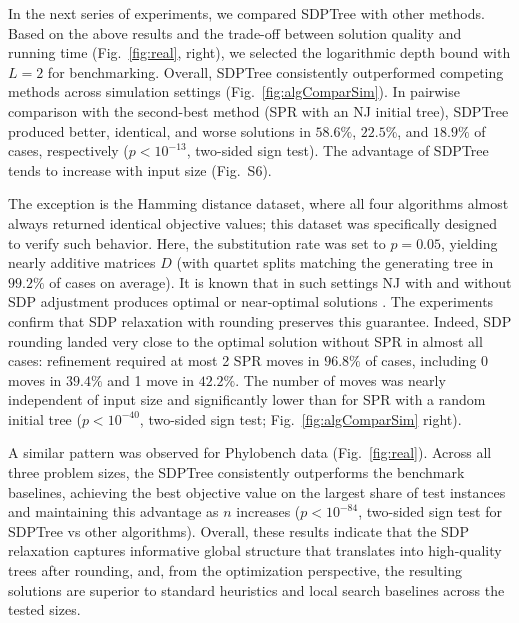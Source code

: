 \documentclass{article}
\begin{document}

In the next series of experiments, we compared SDPTree
with other methods. Based on the above results and the
trade-off between solution quality and running time (Fig.~\ref{fig:real}, right),
we selected the logarithmic depth bound with $L=2$
for benchmarking. Overall, SDPTree consistently
outperformed competing methods across
simulation settings (Fig.~\ref{fig:algComparSim}).
In pairwise comparison with the second-best method
(SPR with an NJ initial tree), SDPTree produced
better, identical, and worse solutions in $58.6\%$,
$22.5\%$, and $18.9\%$ of cases, respectively
($p<10^{-13}$, two-sided sign test). The advantage
of SDPTree tends to increase with input size
(Fig.~S6).

The exception is the Hamming distance dataset, where all
four algorithms almost always returned identical objective
values; this dataset was specifically designed to verify such behavior. Here, the
substitution rate was set to $p=0.05$, yielding nearly
additive matrices $D$ (with quartet splits matching the
generating tree in $99.2\%$ of cases on average). 
It is known that in such settings NJ with and without SDP adjustment produces optimal or near-optimal
solutions \cite{atteson1999performance}. The experiments
confirm that SDP relaxation with rounding preserves this guarantee. Indeed, SDP rounding landed very close to the optimal solution without
SPR in almost all cases: refinement required at most 2 SPR moves in $96.8\%$
of cases, including 0 moves in $39.4\%$ and 1 move in
$42.2\%$. The number of moves was nearly independent of
input size and significantly lower than for SPR with a
random initial tree ($p<10^{-40}$, two-sided sign test;
Fig.~\ref{fig:algComparSim} right).

A similar pattern was observed for Phylobench data
(Fig.~\ref{fig:real}). Across all three problem sizes, the SDPTree consistently outperforms the benchmark baselines, achieving the best objective value on the largest share of test instances and maintaining this advantage as $n$ increases ($p<10^{-84}$, two-sided sign test for SDPTree vs other algorithms). Overall, these results indicate that the SDP relaxation captures informative global structure that translates into high-quality trees after rounding, and, from the optimization perspective, the resulting solutions are  superior to standard heuristics and local search baselines across the tested sizes.
\end{document}
